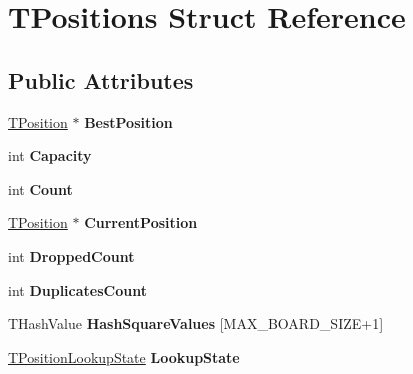 \hypertarget{struct_t_positions}{}\section{T\+Positions Struct Reference}
\label{struct_t_positions}
\subsection*{Public Attributes}
\begin{DoxyCompactItemize}
\item 
\mbox{\label{struct_t_positions_a4c61ce4b6c1371fe908153b91c556fed}} 
\hyperlink{struct_t_position}{T\+Position} $\ast$ {\bfseries Best\+Position}
\item 
\mbox{\label{struct_t_positions_a2a0b13fcc6f9ac6b1ddb6db4da39aabc}} 
int {\bfseries Capacity}
\item 
\mbox{\label{struct_t_positions_ad558cb82d496e7cba4f9657fb15ee903}} 
int {\bfseries Count}
\item 
\mbox{\label{struct_t_positions_ab36627543c2f9b22f032aa833cc7b3d9}} 
\hyperlink{struct_t_position}{T\+Position} $\ast$ {\bfseries Current\+Position}
\item 
\mbox{\label{struct_t_positions_a5319abf0b749571b07ac022b30bc4af8}} 
int {\bfseries Dropped\+Count}
\item 
\mbox{\label{struct_t_positions_ae87a999177bc145cc41c111d8cd815cb}} 
int {\bfseries Duplicates\+Count}
\item 
\mbox{\label{struct_t_positions_aa11e2855db82f000c8c3da8294a0510e}} 
T\+Hash\+Value {\bfseries Hash\+Square\+Values} \mbox{[}M\+A\+X\+\_\+\+B\+O\+A\+R\+D\+\_\+\+S\+I\+ZE+1\mbox{]}
\item 
\mbox{\label{struct_t_positions_ab00bce182958fe320691d324357482ff}} 
\hyperlink{struct_t_position_lookup_state}{T\+Position\+Lookup\+State} {\bfseries Lookup\+State}
\item 
\mbox{\label{struct_t_positions_acf29d22c3cb5424b67fa492147fd4211}} 

\end{DoxyCompactItemize}

